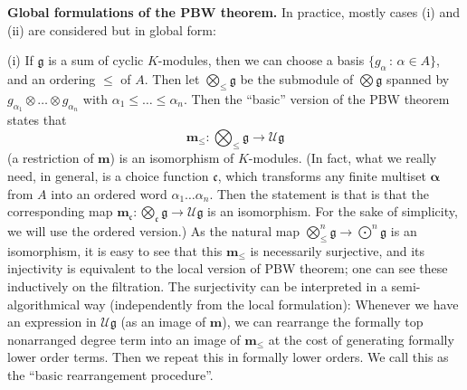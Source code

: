 \documentclass[11pt,a4paper]{amsart}
\newcommand{\bo}{\boldsymbol}
\newcommand{\bodot}{{\textstyle\bigodot}}
\theoremstyle{definition}
\theoremstyle{plain}
\begin{document}
\textbf{Global formulations of the PBW theorem.}
In practice, mostly cases  (i) and (ii) are considered but in global form:

(i) If $\mathfrak g$ is a sum of cyclic $K$-modules, then we can choose a basis
 $\{g_\alpha\,:\,\alpha\in A\}$, and an ordering $\leq$ of $A$.
Then let $\bigotimes_\leq\mathfrak g$ be the submodule of $\bigotimes\mathfrak g$ spanned by
$g_{\alpha_1}\otimes \ldots\otimes g_{\alpha_n}$ with $\alpha_1\leq\ldots\leq\alpha_n$.
Then the ``basic'' version of the PBW theorem states that
\begin{equation*}\boldsymbol m_\leq:\textstyle{\bigotimes_\leq\mathfrak g}\rightarrow\mathcal U\mathfrak g\end{equation*}
 (a restriction of $\boldsymbol m$) is an isomorphism of $K$-modules.
(In fact, what we really need, in general, is a choice function $\mathfrak c$, which transforms any
 finite multiset $\bo\alpha$ from $A$ into an ordered word $\alpha_1 \ldots \alpha_n$.
Then the statement is that is that the corresponding map
 $\boldsymbol m_{\mathfrak c}:\textstyle{\bigotimes_{\mathfrak c}\mathfrak g}\rightarrow\mathcal U\mathfrak g$
 is an isomorphism.
For the sake of simplicity, we will use the ordered version.)
As the natural map $\bigotimes_\leq^n\mathfrak g\rightarrow\bodot^n\mathfrak g$ is an isomorphism,
 it is easy to see that this $\boldsymbol m_\leq$ is necessarily surjective,
 and its injectivity is equivalent to the local version of PBW theorem; one can see these inductively on the filtration.
The surjectivity can be interpreted in a semi-algorithmical way (independently from the local formulation):
Whenever we have an expression in $\mathcal U\mathfrak g$ (as an image of $\bo m$),
 we can rearrange the formally top nonarranged degree term into an image of $\bo m_\leq$
 at the cost of generating formally lower order terms.
Then we repeat this in formally lower orders. We call this as the ``basic rearrangement procedure''.
\end{document}
